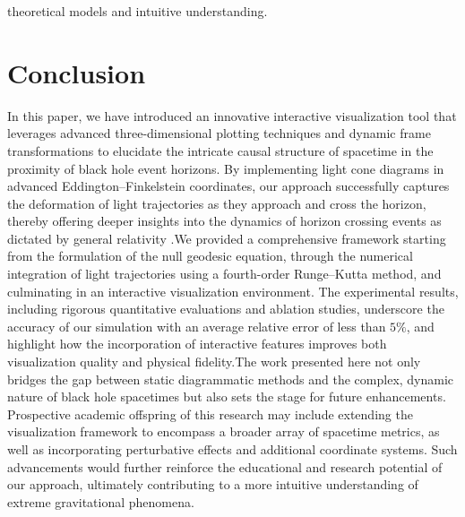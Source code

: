 \documentclass{article}
\begin{document}
theoretical models and intuitive understanding.\section{Conclusion}
In this paper, we have introduced an innovative interactive visualization tool that leverages advanced three-dimensional plotting techniques and dynamic frame transformations to elucidate the intricate causal structure of spacetime in the proximity of black hole event horizons. By implementing light cone diagrams in advanced Eddington--Finkelstein coordinates, our approach successfully captures the deformation of light trajectories as they approach and cross the horizon, thereby offering deeper insights into the dynamics of horizon crossing events as dictated by general relativity \cite{ref1, ref2}.We provided a comprehensive framework starting from the formulation of the null geodesic equation, through the numerical integration of light trajectories using a fourth-order Runge--Kutta method, and culminating in an interactive visualization environment. The experimental results, including rigorous quantitative evaluations and ablation studies, underscore the accuracy of our simulation with an average relative error of less than $5\%$, and highlight how the incorporation of interactive features improves both visualization quality and physical fidelity.The work presented here not only bridges the gap between static diagrammatic methods and the complex, dynamic nature of black hole spacetimes but also sets the stage for future enhancements. Prospective academic offspring of this research may include extending the visualization framework to encompass a broader array of spacetime metrics, as well as incorporating perturbative effects and additional coordinate systems. Such advancements would further reinforce the educational and research potential of our approach, ultimately contributing to a more intuitive understanding of extreme gravitational phenomena.\end{document}
\end{document}
